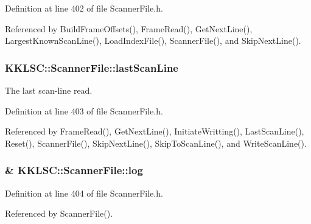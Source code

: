Definition at line 402 of file Scanner\+File.\+h.



Referenced by Build\+Frame\+Offsets(), Frame\+Read(), Get\+Next\+Line(), Largest\+Known\+Scan\+Line(), Load\+Index\+File(), Scanner\+File(), and Skip\+Next\+Line().

\subsubsection[{\texorpdfstring{last\+Scan\+Line}{lastScanLine}}]{ K\+K\+L\+S\+C\+::\+Scanner\+File\+::last\+Scan\+Line\hspace{0.3cm}{\ttfamily [protected]}}\hypertarget{class_k_k_l_s_c_1_1_scanner_file_ae3275a2f28235ba289bf341cdc8373a6}{}\label{class_k_k_l_s_c_1_1_scanner_file_ae3275a2f28235ba289bf341cdc8373a6}
The last scan-\/line read. 

Definition at line 403 of file Scanner\+File.\+h.



Referenced by Frame\+Read(), Get\+Next\+Line(), Initiate\+Writting(), Last\+Scan\+Line(), Reset(), Scanner\+File(), Skip\+Next\+Line(), Skip\+To\+Scan\+Line(), and Write\+Scan\+Line().

\subsubsection[{\texorpdfstring{log}{log}}]{\& K\+K\+L\+S\+C\+::\+Scanner\+File\+::log\hspace{0.3cm}{\ttfamily [protected]}}\hypertarget{class_k_k_l_s_c_1_1_scanner_file_ac13ba14175151a7f0bb791c56e72af93}{}\label{class_k_k_l_s_c_1_1_scanner_file_ac13ba14175151a7f0bb791c56e72af93}


Definition at line 404 of file Scanner\+File.\+h.



Referenced by Scanner\+File().

